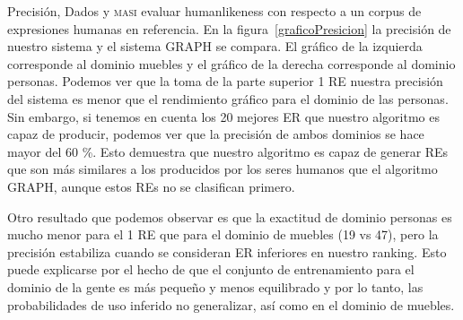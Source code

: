 Precisi\'on, Dados y \textsc{masi}  evaluar humanlikeness con respecto a un corpus de expresiones humanas en referencia. En la figura~\ref{graficoPresicion} la precisi\'on de nuestro sistema y el sistema GRAPH se compara. El gr\'afico de la izquierda corresponde al dominio muebles y el gr\'afico de la derecha corresponde al dominio personas. Podemos ver que la toma de la parte superior 1 RE nuestra precisi\'on del sistema es menor que el rendimiento gr\'afico para el dominio de las personas. Sin embargo, si tenemos en cuenta los 20 mejores ER que nuestro algoritmo es capaz de producir, podemos ver que la precisi\'on de ambos dominios se hace mayor del 60 \%. Esto demuestra que nuestro algoritmo es capaz de generar REs que son m\'as similares a los producidos por los seres humanos que el algoritmo GRAPH, aunque estos REs no se clasifican primero.

Otro resultado que podemos observar es que la exactitud de dominio personas es mucho menor para el 1 RE que para el dominio de muebles (19 vs 47), pero la precisi\'on estabiliza cuando se consideran ER inferiores en nuestro ranking. Esto puede explicarse por el hecho de que el conjunto de entrenamiento para el dominio de la gente es m\'as peque\~no y menos equilibrado y por lo tanto, las probabilidades de uso inferido no generalizar, as\'{i} como en el dominio de muebles.

